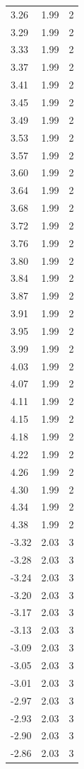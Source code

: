 \begin{longtable}{lrr}
  3.26 & 1.99 & 2 \\
  3.29 & 1.99 & 2 \\
  3.33 & 1.99 & 2 \\
  3.37 & 1.99 & 2 \\
  3.41 & 1.99 & 2 \\
  3.45 & 1.99 & 2 \\
  3.49 & 1.99 & 2 \\
  3.53 & 1.99 & 2 \\
  3.57 & 1.99 & 2 \\
  3.60 & 1.99 & 2 \\
  3.64 & 1.99 & 2 \\
  3.68 & 1.99 & 2 \\
  3.72 & 1.99 & 2 \\
  3.76 & 1.99 & 2 \\
  3.80 & 1.99 & 2 \\
  3.84 & 1.99 & 2 \\
  3.87 & 1.99 & 2 \\
  3.91 & 1.99 & 2 \\
  3.95 & 1.99 & 2 \\
  3.99 & 1.99 & 2 \\
  4.03 & 1.99 & 2 \\
  4.07 & 1.99 & 2 \\
  4.11 & 1.99 & 2 \\
  4.15 & 1.99 & 2 \\
  4.18 & 1.99 & 2 \\
  4.22 & 1.99 & 2 \\
  4.26 & 1.99 & 2 \\
  4.30 & 1.99 & 2 \\
  4.34 & 1.99 & 2 \\
  4.38 & 1.99 & 2 \\
  -3.32 & 2.03 & 3 \\
  -3.28 & 2.03 & 3 \\
  -3.24 & 2.03 & 3 \\
  -3.20 & 2.03 & 3 \\
  -3.17 & 2.03 & 3 \\
  -3.13 & 2.03 & 3 \\
  -3.09 & 2.03 & 3 \\
  -3.05 & 2.03 & 3 \\
  -3.01 & 2.03 & 3 \\
  -2.97 & 2.03 & 3 \\
  -2.93 & 2.03 & 3 \\
  -2.90 & 2.03 & 3 \\
  -2.86 & 2.03 & 3 \\

\end{longtable}
